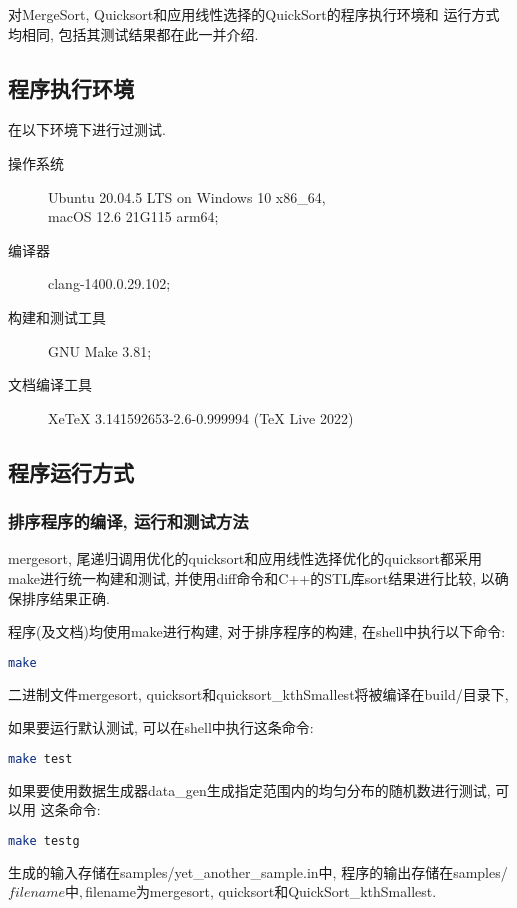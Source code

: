 对MergeSort, Quicksort和应用线性选择的QuickSort的程序执行环境和
运行方式均相同, 包括其测试结果都在此一并介绍.

\subsection{程序执行环境}
在以下环境下进行过测试.
\begin{description}
	\item[操作系统] Ubuntu 20.04.5 LTS on Windows 10 x86\_64, \\
		macOS 12.6 21G115 arm64;
	\item[编译器] clang-1400.0.29.102;
	\item[构建和测试工具] GNU Make 3.81;
	\item[文档编译工具] XeTeX 3.141592653-2.6-0.999994 (TeX Live 2022)
\end{description}

\subsection{程序运行方式}
\subsubsection{排序程序的编译, 运行和测试方法}
mergesort, 尾递归调用优化的quicksort和应用线性选择优化的quicksort都采用
make进行统一构建和测试, 并使用diff命令和C++的STL库sort结果进行比较,
以确保排序结果正确.\par

程序(及文档)均使用make进行构建, 对于排序程序的构建, 在shell中执行以下命令:
\begin{lstlisting}[language=bash]
make
\end{lstlisting}
二进制文件mergesort, quicksort和quicksort\_kthSmallest将被编译在build/目录下,

如果要运行默认测试, 可以在shell中执行这条命令:
\begin{lstlisting}[language=bash]
make test
\end{lstlisting}

如果要使用数据生成器data\_gen生成指定范围内的均匀分布的随机数进行测试, 可以用
这条命令:
\begin{lstlisting}[language=bash]
make testg
\end{lstlisting}
生成的输入存储在samples/yet\_another\_sample.in中, 程序的输出存储在samples/
${filename} 中, ${filename}为mergesort, quicksort和QuickSort\_kthSmallest.\par

